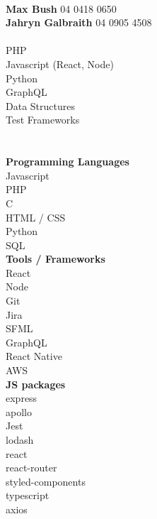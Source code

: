 \documentclass[8pt]{developercv}
\newcommand{\CC}{C\nolinebreak\hspace{-.05em}\raisebox{.4ex}{\tiny\bf +}\nolinebreak\hspace{-.10em}\raisebox{.4ex}{\tiny\bf +}}
\def\CC{{C\nolinebreak[4]\hspace{-.05em}\raisebox{.4ex}{\tiny\bf ++}}}
\begin{document}
	\begin{minipage}[t]{0.3\textwidth}		%
		\\
		\textbf{Max Bush} 04 0418 0650\\
		\textbf{Jahryn Galbraith} 04 0905 4508\\

		\\
		{PHP}\\
		{Javascript (React, Node)}\\
		{Python}\\
		{GraphQL}\\
		{Data Structures}\\
		{Test Frameworks}\\
		
		\\
		\\\textbf{Programming Languages}\\
		{Javascript}\\
		{PHP}\\
		{\CC}\\
		{HTML / CSS}\\
		{Python}\\
		{SQL}\\

		\textbf{Tools / Frameworks}\\
		{React}\\
		{Node}\\
		{Git}\\
		{Jira}\\
		{SFML}\\
		{GraphQL}\\
		{React Native}\\
		{AWS}\\
		
		\textbf{JS packages}\\
		{express}\\
		{apollo}\\
		{Jest}\\
		{lodash}\\
		{react}\\
		{react-router}\\
		{styled-components}\\
		{typescript}\\
		{axios}\\

	\end{minipage}
\end{document}

